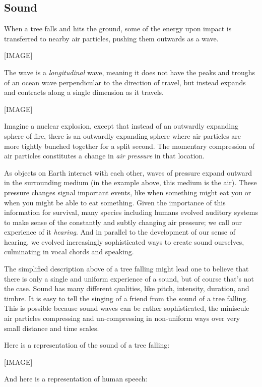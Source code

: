 \documentclass[UTF8]{book}
\begin{document}
\begin{CJK}{UTF8}{gbsn}
\section{Sound}

When a tree falls and hits the ground, some of the energy upon impact is transferred to nearby air particles, pushing them outwards as a wave.

[IMAGE]

The wave is a \emph{longitudinal} wave, meaning it does not have the peaks and troughs of an ocean wave perpendicular to the direction of travel, but instead expands and contracts along a single dimension as it travels.

[IMAGE]

Imagine a nuclear explosion, except that instead of an outwardly expanding sphere of fire, there is an outwardly expanding sphere where air particles are more tightly bunched together for a split second. The momentary compression of air particles constitutes a change in \emph{air pressure} in that location.

As objects on Earth interact with each other, waves of pressure expand outward in the surrounding medium (in the example above, this medium is the air). These pressure changes signal important events, like when something might eat you or when you might be able to eat something. Given the importance of this information for survival, many species including humans evolved auditory systems to make sense of the constantly and subtly changing air pressure; we call our experience of it \emph{hearing}. And in parallel to the development of our sense of hearing, we evolved increasingly sophisticated ways to create sound ourselves, culminating in vocal chords and speaking.

The simplified description above of a tree falling might lead one to believe that there is only a single and uniform experience of a sound, but of course that's not the case. Sound has many different qualities, like pitch, intensity, duration, and timbre. It is easy to tell the singing of a friend from the sound of a tree falling. This is possible because sound waves can be rather sophisticated, the miniscule air particles compressing and un-compressing in non-uniform ways over very small distance and time scales.

Here is a representation of the sound of a tree falling:

[IMAGE]

And here is a representation of human speech:


\end{CJK}
\end{document}

